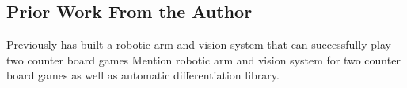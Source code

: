 \subsection{Prior Work From the Author}
Previously has built a robotic arm and vision system that can successfully play two counter board games
Mention robotic arm and vision system for two counter board games as well as automatic differentiation library.
